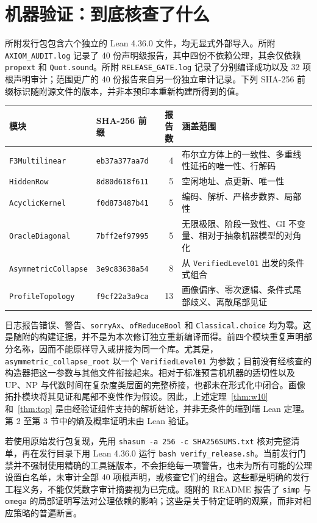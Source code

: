 \documentclass[11pt,a4paper]{article}
\begin{document}
\section{机器验证：到底核查了什么}
所附发行包包含六个独立的 Lean 4.36.0 文件，均无显式外部导入。所附 \texttt{AXIOM\_AUDIT.log} 记录了 40 份声明级报告，其中四份不依赖公理，其余仅依赖 \texttt{propext} 和 \texttt{Quot.sound}。所附 \texttt{RELEASE\_GATE.log} 记录了分别编译成功以及 32 项根声明审计；范围更广的 40 份报告来自另一份独立审计记录。下列 SHA-256 前缀标识随附源文件的版本，并非本预印本重新构建所得到的值。
\begin{center}\small
\begin{tabularx}{\linewidth}{@{}l l r Y@{}}
\toprule
\textbf{模块} & \textbf{SHA-256 前缀} & \textbf{报告数} & \textbf{涵盖范围}\\
\midrule
\texttt{F3Multilinear} & \texttt{eb37a377aa7d} & 4 & 布尔立方体上的一致性、多重线性延拓的唯一性、行解码\\
\texttt{HiddenRow} & \texttt{8d80d618f611} & 5 & 空闲地址、点更新、唯一性\\
\texttt{AcyclicKernel} & \texttt{f0d873487b41} & 5 & 编码、解析、严格步数界、局部性\\
\texttt{OracleDiagonal} & \texttt{7bff2ef97995} & 5 & 无限极限、阶段一致性、GI 不变量、相对于抽象机器模型的对角化\\
\texttt{AsymmetricCollapse} & \texttt{3e9c83638a54} & 8 & 从 \texttt{VerifiedLevel01} 出发的条件式组合\\
\texttt{ProfileTopology} & \texttt{f9cf22a3a9ca} & 13 & 画像偏序、零次逻辑、条件式尾部歧义、离散尾部见证\\
\bottomrule
\end{tabularx}
\end{center}
日志报告错误、警告、\texttt{sorryAx}、\texttt{ofReduceBool} 和 \texttt{Classical.choice} 均为零。这是随附的构建证据，并不是为本次修订独立重新编译而得。前四个模块重复声明部分名称，因而不能原样导入或拼接为同一个库。尤其是，\texttt{asymmetric\_collapse\_root} 以一个 \texttt{VerifiedLevel01} 为参数；目前没有经核查的构造器把这一参数与其他文件衔接起来。相对于标准预言机机器的适切性以及 UP、NP 与代数时间在复杂度类层面的完整桥接，也都未在形式化中闭合。画像拓扑模块将其见证和尾部不变性作为假设。因此，上述定理~\ref{thm:w10} 和~\ref{thm:top} 是由经验证组件支持的解析结论，并非无条件的端到端 Lean 定理。第 2 至第 3 节中的熵及概率证明未由 Lean 验证。

若使用原始发行包复现，先用 \texttt{shasum -a 256 -c SHA256SUMS.txt} 核对完整清单，再在发行目录下用 Lean 4.36.0 运行 \texttt{bash verify\_release.sh}。当前发行门禁并不强制使用精确的工具链版本，不会拒绝每一项警告，也未为所有可能的公理设置白名单，未审计全部 40 项根声明，或核查它们的组合。这些都是明确的发行工程义务，不能仅凭数字审计摘要视为已完成。随附的 README 报告了 \texttt{simp} 与 \texttt{omega} 的局部证明写法对公理依赖的影响；这些是关于特定证明的观察，而非对相应策略的普遍断言。
\end{document}
